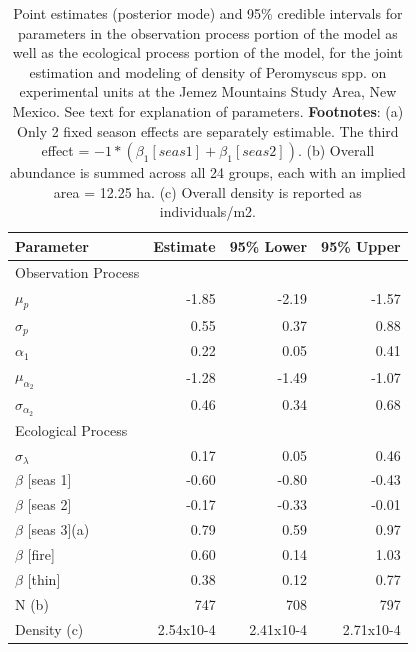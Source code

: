 \begin{table}
\centering
\caption{
  Point estimates (posterior mode) and 95\% credible intervals
  for parameters in the observation
  process portion of the model as well
  as the ecological process portion of
  the model, for the joint estimation
  and modeling of density of
  Peromyscus spp. on experimental
  units at the Jemez Mountains Study
  Area, New Mexico.  See text for explanation of parameters. 
  {\bf Footnotes}: 
  (a) Only 2 fixed season effects are separately estimable.  The third
  effect =
  $ -1*(\beta_1 [seas 1]+\beta_1 [seas 2])$.
  (b) Overall abundance is summed across all 24 groups, each with an
  implied 
  area = 12.25 ha.  
  (c) Overall density is reported as individuals/m2.  
}
\begin{tabular}{lrrr}
\hline \hline
Parameter &	Estimate &	95\% Lower &	95\% Upper 
\\ \hline
Observation Process & & & \\ \hline
$\mu_{p}$        &-1.85 & -2.19 &	-1.57 \\
$\sigma_{p}$           &0.55  & 0.37  &	0.88 \\
$\alpha_1$        &0.22  & 0.05  &	0.41 \\
$\mu_{\alpha_{2}}$             &-1.28 & -1.49 &	-1.07 \\
$\sigma_{\alpha_{2}}$     &0.46  & 0.34  &		0.68 \\ \hline \hline
Ecological Process & & & \\
\hline
$\sigma_{\lambda}$      & 0.17 & 0.05  &	0.46 \\
$\beta$ [seas 1]&-0.60 & -0.80 &	-0.43 \\
$\beta$ [seas 2]&-0.17 & -0.33 &	-0.01\\
$\beta$ [seas 3](a)&0.79 & 0.59  &	0.97\\
$\beta$ [fire] &	0.60     & 0.14  &	1.03 \\
$\beta$ [thin] &	0.38     & 0.12  &	0.77 \\
N (b)&	747&	708      & 797 \\
Density (c)&2.54x10-4&2.41x10-4&	2.71x10-4 \\ \hline
\end{tabular}
\end{table}







\clearpage

